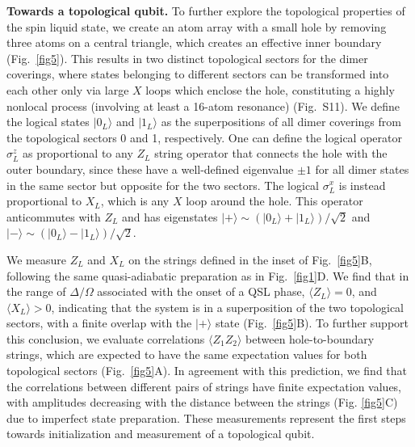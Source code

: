 \documentclass[twocolumn,amssymb,secnumarabic, prl, aps, nofootinbib]{revtex4-1}
\begin{document}
\noindent \textbf{Towards a topological qubit.}
To further explore the topological properties of the spin liquid state, we create an atom array with a small hole
by removing three atoms on a central triangle, which creates an effective inner boundary (Fig.~\ref{fig5}). This results in two distinct topological sectors for the dimer coverings, where states belonging to different sectors can be transformed into each other only via large $X$ loops which enclose the hole, constituting
a highly nonlocal process (involving at least a 16-atom resonance) (Fig.~S11). 
We define the logical states $|0_L\rangle$ and $|1_L\rangle$ as the superpositions of all
dimer coverings from the topological sectors 0 and 1, respectively. One can define \cite{Ruben2020} the logical operator $\sigma^z_L$ as proportional to 
any $Z_L$ string operator that connects the hole with the outer boundary, since these have a well-defined eigenvalue $\pm 1$ for all dimer states in the same sector but opposite for the two sectors. The logical $\sigma^x_L$ is instead proportional to $X_L$, which is any $X$ loop around the hole. This operator anticommutes with $Z_L$ and has eigenstates $|+ \rangle \sim (|0_L\rangle + |1_L\rangle)/\sqrt{2}$ and $|- \rangle \sim (|0_L\rangle - |1_L\rangle)/\sqrt{2}$. 

We measure $Z_L$ and $X_L$ on the strings defined in the inset of Fig.~\ref{fig5}B, following the same quasi-adiabatic preparation as in Fig.~\ref{fig1}D.
We find that in the range of $\Delta/\Omega$ associated with the onset of a QSL phase, $\langle Z_L \rangle = 0$, and $\langle X_L \rangle > 0$, indicating that the system is in a superposition of the two topological sectors, with 
a finite overlap with the $|+\rangle$ state (Fig.~\ref{fig5}B). To further support this conclusion,  we evaluate correlations $\langle Z_1 Z_2\rangle$ between hole-to-boundary strings, which are expected to have the same expectation values for both topological sectors (Fig.~\ref{fig5}A). 
In agreement with this prediction,  we find that the correlations between different pairs of strings have finite expectation values, with amplitudes decreasing with the distance between the strings (Fig. \ref{fig5}C) due to imperfect state preparation.
These measurements
represent the first steps towards initialization and measurement of a
topological qubit. 
\\
\end{document}
